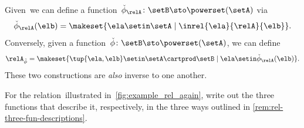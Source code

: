 \begin{enumerate}
          Given~\relA we can define a function~$\check \phi_{\relA} \colon \setB \sto \powerset (\setA)$ via
          \begin{equation}
              \check \phi_{\relA} (\elb) = \makeset{ \ela \setin \setA \mid \inrel{\ela}{\relA}{\elb}}.
          \end{equation}
          Conversely, given a function~$\check \phi \colon \setB \sto \powerset (\setA)$, we can define
          \begin{equation}
              \relA_{\check \phi} = \makeset{ \tup{\ela, \elb} \setin \setA \cartprod \setB \mid \ela \setin \check \phi_{\relA}(\elb)}.
          \end{equation}
          These two constructions are \emph{also} inverse to one another.
\end{enumerate}

\begin{marginfigure}
    \centering
    \caption{}
    \label{fig:example_rel_again}
\end{marginfigure}
\vfill
\begin{gradedexercise}
    \label{ex:Rel3Functions}
    For the relation~\relA illustrated in~\cref{fig:example_rel_again}, write out the three functions that describe it, respectively, in the three ways outlined in \cref{rem:rel-three-fun-descriptions}.
\end{gradedexercise}

